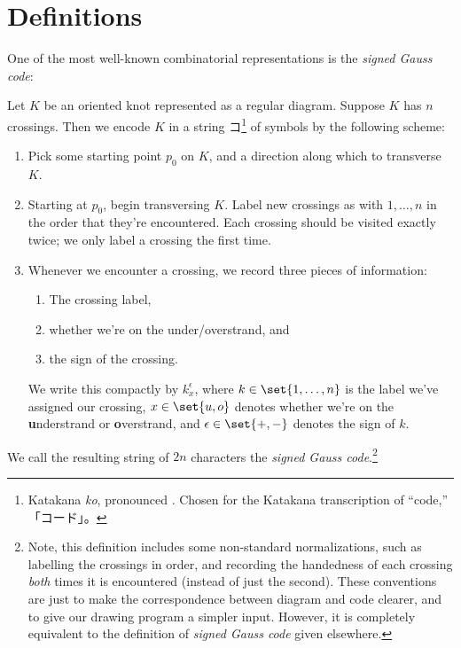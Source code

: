 \section{Definitions}
One of the most well-known combinatorial representations is the
\emph{signed Gauss code}:
\begin{definition}\label{def:signed-gauss-code}
  Let $K$ be an oriented knot represented as a regular diagram.
  Suppose $K$ has $n$ crossings. Then we encode $K$ in a string
  $コ$\footnote{Katakana \emph{ko}, pronounced . Chosen for
    the Katakana transcription of ``code,'' 「コード」。} of
  symbols by the following scheme:
  \begin{enumerate}
    \item Pick some starting point $p_0$ on $K$, and a direction along
      which to transverse $K$.
  \item Starting at $p_0$, begin transversing $K$. Label new crossings
      as with $1, \ldots, n$ in the order that they're encountered.
      Each crossing should be visited exactly twice; we only label a
      crossing the first time.
  \item Whenever we encounter a crossing, we record three pieces of
    information:
    \begin{enumerate}
    \item The crossing label,
    \item whether we're on the under/overstrand, and
    \item the sign of the crossing.
    \end{enumerate}
    We write this compactly by $k_{x}^\epsilon$, where $k \in \set{1,
      \ldots, n}$ is the label we've assigned our crossing, $x \in
      \set{u, o}$ denotes whether we're on the \textbf{u}nderstrand or
      \textbf{o}verstrand, and $\epsilon \in \set{+, -}$ denotes the
      sign of $k$.
  \end{enumerate}
  We call the resulting string of $2n$ characters the \emph{signed
    Gauss code}.\footnote{Note, this definition includes some
    non-standard normalizations, such as labelling the crossings in
    order, and recording the handedness of each crossing \emph{both}
    times it is encountered (instead of just the second). These
    conventions are just to make the correspondence between diagram
    and code clearer, and to give our drawing program a simpler input.
    However, it is completely equivalent to the definition of
    \emph{signed Gauss code} given elsewhere.}
\end{definition}
